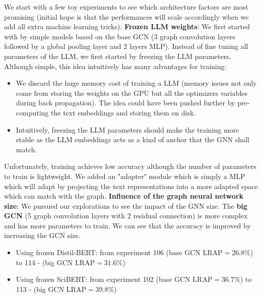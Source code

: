 We start with a few toy experiments to see which architecture factors are most promising (initial hope is that the performances will scale accordingly when we add all extra machine learning tricks).
\textbf{Frozen LLM weights}: We first started with by simple models based on the base GCN (3 graph convolution layers followed by a global pooling layer and 2 layers MLP). Instead of fine tuning all parameters of the LLM, we first started by freezing the LLM parameters. Although simple, this idea intuitively has many advantages for training:
\begin{itemize}
    \item We discard the huge memory cost of training a LLM (memory issues not only come from storing the weights on the GPU but all the optimizers variables during back propagation). The idea could have been pushed further by pre-computing the text embeddings and storing them on disk. 
    \item Intuitively, freezing the LLM parameters should make the training more stable as the LLM embeddings acts as a kind of anchor that the GNN shall match.
\end{itemize}
Unfortunately, training achieves low accuracy although the number of parameters to train is lightweight. We added an "adapter" module which is simply a MLP which will adapt by projecting the text representations into a more adapted space which can match with the graph.
\textbf{Influence of the graph neural network size}: We pursued our explorations to see the impact of the GNN size. The \textbf{big GCN} (5 graph convolution layers with 2 residual connection) is more complex and has more parameters to train. We can see that the accuracy is improved by increasing the GCN size. 
\begin{itemize}
    \item Using frozen Distil-BERT: from experiment 106 (base GCN $\text{LRAP}=26.8\%$) to 114 - (big GCN $\text{LRAP}=31.6\%$)
    \item Using frozen SciBERT: from experiment 102 (base GCN $\text{LRAP}=36.7\%$) to 113 - (big GCN $\text{LRAP}=39.8\%$)
\end{itemize}


